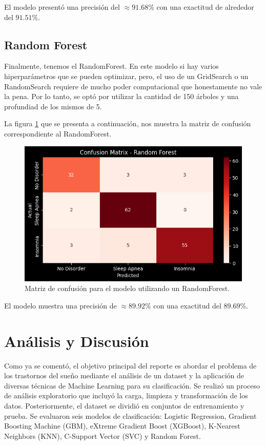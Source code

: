 \documentclass{replab}
\begin{document}
El modelo presentó una precisión del $\approx 91.68\%$ con una exactitud de alrededor del $91.51\%$.

    \subsection{Random Forest}

Finalmente, tenemos el RandomForest. En este modelo si hay varios hiperparámetros que se pueden optimizar, pero, el uso de un GridSearch o un RandomSearch requiere de mucho poder computacional que honestamente no vale la pena. Por lo tanto, se optó por utilizar la cantidad de 150 árboles y una profundiad de los mismos de 5.

La figura \ref{fig:matrizRNF} que se presenta a continuación, nos muestra la matriz de confusión correspondiente al RandomForest.

\begin{figure}[hbt!]
    \centering
    \includegraphics[width=0.85\columnwidth]{imagenes/RandomForest.png}
    \caption{Matriz de confusión para el modelo utilizando un RandomForest.}
    \label{fig:matrizRNF}
\end{figure}

El modelo muestra una precisión de $\approx 89.92\%$ con una exactitud del $89.69\%$.

\section{Análisis y Discusión}

Como ya se comentó, el objetivo principal del reporte es abordar el problema de los trastornos del sueño mediante el análisis de un dataset y la aplicación de diversas técnicas de Machine Learning para su clasificación. Se realizó un proceso de análisis exploratorio que incluyó la carga, limpieza y transformación de los datos. Posteriormente, el dataset se dividió en conjuntos de entrenamiento y prueba. Se evaluaron seis modelos de clasificación: Logistic Regression, Gradient Boosting Machine (GBM), eXtreme Gradient Boost (XGBoost), K-Nearest Neighbors (KNN), C-Support Vector (SVC) y Random Forest.
\end{document}
